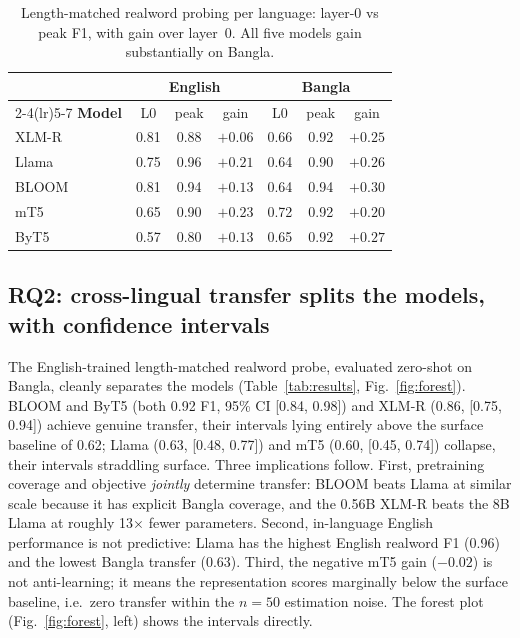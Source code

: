 \documentclass[preprint,12pt]{elsarticle}
\begin{document}
\begin{table}[H]
\caption{Length-matched realword probing per language: layer-0 vs peak F1, with gain over layer~0. All five models gain substantially on Bangla.}
\label{tab:realword}
\centering
\small
\setlength{\tabcolsep}{4pt}
\begin{tabular}{lcccccc}
\toprule
& \multicolumn{3}{c}{\textbf{English}} & \multicolumn{3}{c}{\textbf{Bangla}} \\
\cmidrule(lr){2-4}\cmidrule(lr){5-7}
\textbf{Model} & L0 & peak & gain & L0 & peak & gain \\
\midrule
XLM-R & 0.81 & 0.88 & $+0.06$ & 0.66 & 0.92 & $+0.25$ \\
Llama & 0.75 & 0.96 & $+0.21$ & 0.64 & 0.90 & $+0.26$ \\
BLOOM & 0.81 & 0.94 & $+0.13$ & 0.64 & 0.94 & $+0.30$ \\
mT5   & 0.65 & 0.90 & $+0.23$ & 0.72 & 0.92 & $+0.20$ \\
ByT5  & 0.57 & 0.80 & $+0.13$ & 0.65 & 0.92 & $+0.27$ \\
\bottomrule
\end{tabular}
\end{table}

\subsection{RQ2: cross-lingual transfer splits the models, with confidence intervals}
The English-trained length-matched realword probe, evaluated zero-shot on Bangla, cleanly separates the models (Table~\ref{tab:results}, Fig.~\ref{fig:forest}). BLOOM and ByT5 (both 0.92 F1, 95\% CI [0.84, 0.98]) and XLM-R (0.86, [0.75, 0.94]) achieve genuine transfer, their intervals lying entirely above the surface baseline of 0.62; Llama (0.63, [0.48, 0.77]) and mT5 (0.60, [0.45, 0.74]) collapse, their intervals straddling surface. Three implications follow. First, pretraining coverage and objective \emph{jointly} determine transfer: BLOOM beats Llama at similar scale because it has explicit Bangla coverage, and the 0.56B XLM-R beats the 8B Llama at roughly 13$\times$ fewer parameters. Second, in-language English performance is not predictive: Llama has the highest English realword F1 (0.96) and the lowest Bangla transfer (0.63). Third, the negative mT5 gain ($-0.02$) is not anti-learning; it means the representation scores marginally below the surface baseline, i.e.\ zero transfer within the $n=50$ estimation noise. The forest plot (Fig.~\ref{fig:forest}, left) shows the intervals directly.
\end{document}
